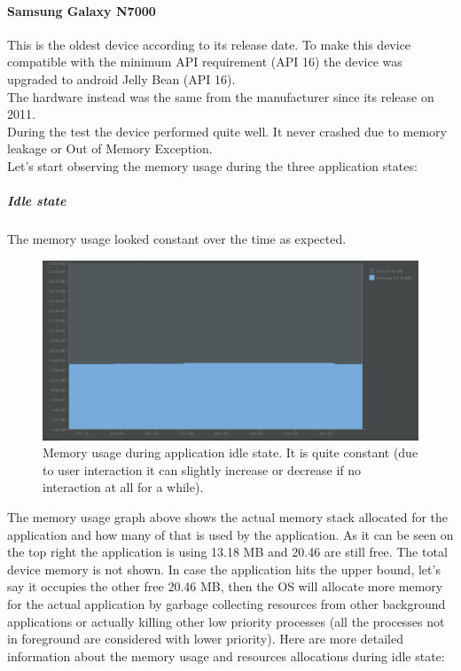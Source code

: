 \paragraph{Samsung Galaxy N7000}
This is the oldest device according to its release date. To make this device compatible with the minimum API requirement (API 16)  the device was upgraded to android Jelly Bean (API 16).\\
The hardware instead was the same from the manufacturer since its release on 2011. \\
During the test the device performed quite well. It never crashed due to memory leakage or Out of Memory Exception.\\
Let’s start observing the memory usage during the three application states:
\subparagraph{Idle state}
The memory usage looked constant over the time as expected.
\begin{figure}[h!]
	\centering
	\includegraphics[width=1\linewidth]{figures/ch10/13.png}
	\caption{Memory usage during application idle state. It is quite constant (due to user interaction it can slightly increase or decrease if no interaction at all for a while).}  
	\label{fig10.13}
\end{figure}
The memory usage graph above shows the actual memory stack allocated for the application and how many of that is used by the application.  As it can be seen on the top right the application is using 13.18 MB and 20.46 are still free. The total device  memory is not shown. In case the application hits the upper bound, let’s say it occupies the other  free 20.46 MB, then the OS will allocate more memory for the actual application by garbage collecting resources from other background applications or actually killing other low priority processes (all the processes not in foreground are considered with lower priority).
\newpage
Here are more detailed information about the memory usage and resources allocations during idle state:
